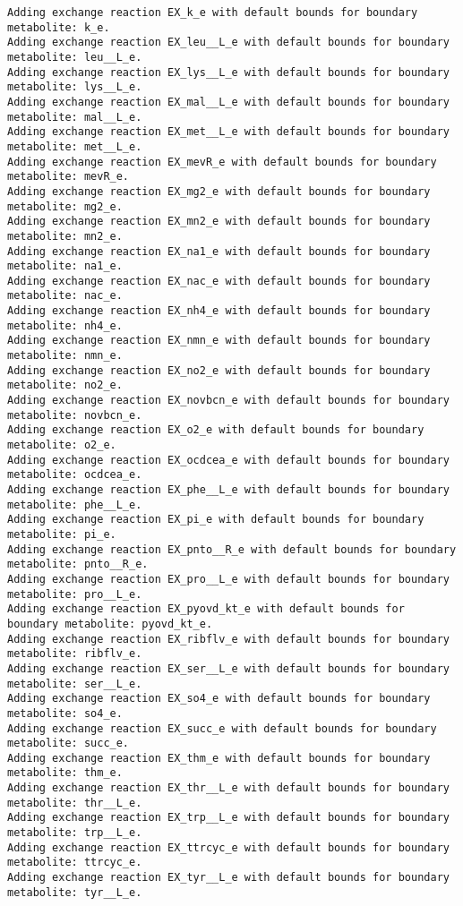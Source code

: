 \documentclass[
  letterpaper,
  DIV=11,
  numbers=noendperiod]{scrartcl}
\begin{document}
\begin{verbatim}
Adding exchange reaction EX_k_e with default bounds for boundary metabolite: k_e.
Adding exchange reaction EX_leu__L_e with default bounds for boundary metabolite: leu__L_e.
Adding exchange reaction EX_lys__L_e with default bounds for boundary metabolite: lys__L_e.
Adding exchange reaction EX_mal__L_e with default bounds for boundary metabolite: mal__L_e.
Adding exchange reaction EX_met__L_e with default bounds for boundary metabolite: met__L_e.
Adding exchange reaction EX_mevR_e with default bounds for boundary metabolite: mevR_e.
Adding exchange reaction EX_mg2_e with default bounds for boundary metabolite: mg2_e.
Adding exchange reaction EX_mn2_e with default bounds for boundary metabolite: mn2_e.
Adding exchange reaction EX_na1_e with default bounds for boundary metabolite: na1_e.
Adding exchange reaction EX_nac_e with default bounds for boundary metabolite: nac_e.
Adding exchange reaction EX_nh4_e with default bounds for boundary metabolite: nh4_e.
Adding exchange reaction EX_nmn_e with default bounds for boundary metabolite: nmn_e.
Adding exchange reaction EX_no2_e with default bounds for boundary metabolite: no2_e.
Adding exchange reaction EX_novbcn_e with default bounds for boundary metabolite: novbcn_e.
Adding exchange reaction EX_o2_e with default bounds for boundary metabolite: o2_e.
Adding exchange reaction EX_ocdcea_e with default bounds for boundary metabolite: ocdcea_e.
Adding exchange reaction EX_phe__L_e with default bounds for boundary metabolite: phe__L_e.
Adding exchange reaction EX_pi_e with default bounds for boundary metabolite: pi_e.
Adding exchange reaction EX_pnto__R_e with default bounds for boundary metabolite: pnto__R_e.
Adding exchange reaction EX_pro__L_e with default bounds for boundary metabolite: pro__L_e.
Adding exchange reaction EX_pyovd_kt_e with default bounds for boundary metabolite: pyovd_kt_e.
Adding exchange reaction EX_ribflv_e with default bounds for boundary metabolite: ribflv_e.
Adding exchange reaction EX_ser__L_e with default bounds for boundary metabolite: ser__L_e.
Adding exchange reaction EX_so4_e with default bounds for boundary metabolite: so4_e.
Adding exchange reaction EX_succ_e with default bounds for boundary metabolite: succ_e.
Adding exchange reaction EX_thm_e with default bounds for boundary metabolite: thm_e.
Adding exchange reaction EX_thr__L_e with default bounds for boundary metabolite: thr__L_e.
Adding exchange reaction EX_trp__L_e with default bounds for boundary metabolite: trp__L_e.
Adding exchange reaction EX_ttrcyc_e with default bounds for boundary metabolite: ttrcyc_e.
Adding exchange reaction EX_tyr__L_e with default bounds for boundary metabolite: tyr__L_e.

\end{verbatim}
\end{document}
